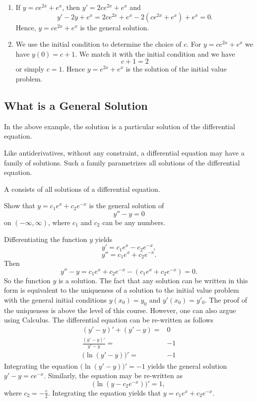 \begin{exersol}
  \begin{enumerate}
    \item If $y =  c e^{2x}  +  e^{x}$, then $y' = 2 c e^{2x} + e^x$ and
          $$ y' - 2 y + e^x  =  2 c e^{2x} + e^x - 2 (c e^{2x}  +  e^{x})  + e^x =  0.  $$
          Hence,  $y =  c e^{2x}  +  e^{x}$ is the general solution.
    \item We use the initial condition to determine the choice of $c$.  For $y =  c e^{2x}  +  e^{x}$ we have $y(0) = c+1$. We match it with the initial condition and we have
          $$  c+1  =2 $$
          or simply $c=1$. Hence $y= e^{2x} + e^x$ is the  solution of the initial value problem.
  \end{enumerate}
\end{exersol}

\subsection{What is a General Solution}
In the above example, the solution is a particular solution of the differential equation.

Like antiderivatives, without any constraint, a differential equation may have a family of solutions. Such a family parametrizes all solutions of the differential equation.
\begin{definition}{}{}
  A  consists of all solutions of a differential equation.
\end{definition}

\begin{example}
  Show that $y= c_1 e^x + c_2 e^{-x}$ is the general solution of
  $$y'' - y =0$$
  on $(-\infty,\infty)$,
  where $c_1$ and $c_2$ can be any numbers.
\end{example}
\begin{solution}
  Differentiating the function $y$ yields
  $$y'= c_1 e^{x} - c_2 e^{-x},$$
  $$y''= c_1 e^{x} + c_2 e^{-x}.$$
  Then
  $$y'' - y=   c_1 e^{x} + c_2 e^{-x}  - ( c_1 e^{x} + c_2 e^{-x} ) = 0.$$
  So the function $y$ is a solution. The fact that any solution can be written in this form is equivalent to the uniqueness of a solution to the initial value problem with the general initial conditions $y(x_0)=y_0$ and $y'(x_0)=y'_0$. The proof of the uniqueness is above the level of this course. However, one can also argue using Calculus. The differential equation can be re-written as follows
  $$
    \begin{aligned}
      (y'-y)'+(y'-y)=       & 0  \\
      \frac{(y'-y)'}{y'-y}= & -1 \\
      \Big(\ln(y'-y)\Big)'= & -1
    \end{aligned}
  $$
  Integrating the equation $\Big(\ln(y'-y)\Big)'=-1$ yields the general solution $y' - y = ce^{-x}$.
  Similarly, the equation may be re-written as
  $$\Big(\ln(y-c_2e^{-x})\Big)'=1,$$
  where $c_2=-\frac{c}{2}$.
  Integrating the equation yields that $y=c_1e^x+c_2e^{-x}$.
\end{solution}

